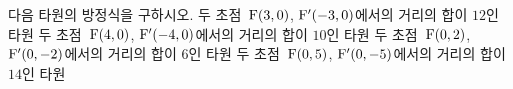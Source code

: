 다음 타원의 방정식을 구하시오.
 두 초점~$\mathrm{F}(3{,}\mkern3mu\mathopen{}0)$, $\mathrm{F}'(-3{,}\mkern3mu\mathopen{}0)$에서의 거리의 합이 $12$인 타원
 두 초점~$\mathrm{F}(4{,}\mkern3mu\mathopen{}0)$, $\mathrm{F}'(-4{,}\mkern3mu\mathopen{}0)$에서의 거리의 합이 $10$인 타원
 두 초점~$\mathrm{F}(0{,}\mkern3mu\mathopen{}2)$, $\mathrm{F}'(0{,}\mkern3mu\mathopen{}-2)$에서의 거리의 합이 $6$인 타원
 두 초점~$\mathrm{F}(0{,}\mkern3mu\mathopen{}5)$, $\mathrm{F}'(0{,}\mkern3mu\mathopen{}-5)$에서의 거리의 합이 $14$인 타원
